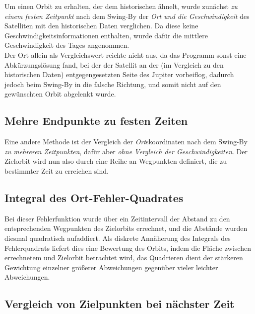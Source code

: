 Um einen Orbit zu erhalten, der dem historischen ähnelt, wurde zunächst \textit{zu einem festen Zeitpunkt} nach dem Swing-By der \textit{Ort und die Geschwindigkeit} des Satelliten mit den historischen Daten verglichen. Da diese keine Geschwindigkeitsinformationen enthalten, wurde dafür die mittlere Geschwindigkeit des Tages angenommen. \\
Der Ort allein als Vergleichswert reichte nicht aus, da das Programm sonst eine Abkürzungslösung fand, bei der der Satellit an der (im Vergleich zu den historischen Daten) entgegengesetzten Seite des Jupiter vorbeiflog, dadurch jedoch beim Swing-By in die falsche Richtung, und somit nicht auf den gewünschten Orbit abgelenkt wurde.

\subsection{Mehre Endpunkte zu festen Zeiten}

Eine andere Methode ist der Vergleich der \textit{Ort}skoordinaten nach dem Swing-By \textit{zu mehreren Zeitpunkten}, dafür aber \textit{ohne Vergleich der Geschwindigkeiten}. Der Zielorbit wird nun also durch eine Reihe an Wegpunkten definiert, die zu bestimmter Zeit zu erreichen sind.

\subsection{Integral des Ort-Fehler-Quadrates}

Bei dieser Fehlerfunktion wurde über ein Zeitintervall der Abstand zu den entsprechenden Wegpunkten des Zielorbits errechnet, und die Abstände wurden diesmal quadratisch aufaddiert. Als diskrete Annäherung des Integrals des Fehlerquadrats liefert dies eine Bewertung des Orbits, indem die Fläche zwischen errechnetem und Zielorbit betrachtet wird, das Quadrieren dient der stärkeren Gewichtung einzelner größerer Abweichungen gegenüber vieler leichter Abweichungen.


\subsection{Vergleich von Zielpunkten bei nächster Zeit}

